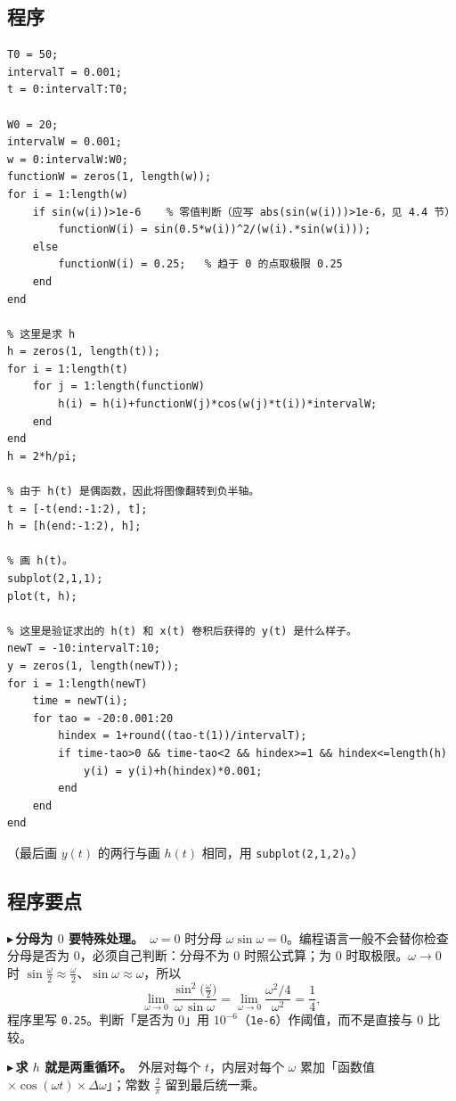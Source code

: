 \documentclass[UTF8,a4paper,11pt]{ctexart}
\newcounter{ex}[section]
\newcommand{\point}[1]{\par\addvspace{1ex}\noindent\textcolor{ptteal}{$\blacktriangleright$\,\textbf{#1}}\ }
\begin{document}
\subsection{程序}
\begin{codebox}
\small
\begin{verbatim}
T0 = 50;
intervalT = 0.001;
t = 0:intervalT:T0;

W0 = 20;
intervalW = 0.001;
w = 0:intervalW:W0;
functionW = zeros(1, length(w));
for i = 1:length(w)
    if sin(w(i))>1e-6    % 零值判断（应写 abs(sin(w(i)))>1e-6，见 4.4 节）
        functionW(i) = sin(0.5*w(i))^2/(w(i).*sin(w(i)));
    else
        functionW(i) = 0.25;   % 趋于 0 的点取极限 0.25
    end
end

% 这里是求 h
h = zeros(1, length(t));
for i = 1:length(t)
    for j = 1:length(functionW)
        h(i) = h(i)+functionW(j)*cos(w(j)*t(i))*intervalW;
    end
end
h = 2*h/pi;

% 由于 h(t) 是偶函数，因此将图像翻转到负半轴。
t = [-t(end:-1:2), t];
h = [h(end:-1:2), h];

% 画 h(t)。
subplot(2,1,1);
plot(t, h);

% 这里是验证求出的 h(t) 和 x(t) 卷积后获得的 y(t) 是什么样子。
newT = -10:intervalT:10;
y = zeros(1, length(newT));
for i = 1:length(newT)
    time = newT(i);
    for tao = -20:0.001:20
        hindex = 1+round((tao-t(1))/intervalT);
        if time-tao>0 && time-tao<2 && hindex>=1 && hindex<=length(h)
            y(i) = y(i)+h(hindex)*0.001;
        end
    end
end
\end{verbatim}
\end{codebox}
（最后画 $y(t)$ 的两行与画 $h(t)$ 相同，用 \texttt{subplot(2,1,2)}。）

\subsection{程序要点}
\point{分母为 $0$ 要特殊处理。}$\omega=0$ 时分母 $\omega\sin\omega=0$。编程语言一般不会替你检查分母是否为 $0$，必须自己判断：分母不为 $0$ 时照公式算；为 $0$ 时取极限。$\omega\to0$ 时 $\sin\frac\omega2\approx\frac\omega2$、$\sin\omega\approx\omega$，所以
\[
\lim_{\omega\to0}\frac{\sin^2\!\big(\frac{\omega}{2}\big)}{\omega\,\sin\omega}=\lim_{\omega\to0}\frac{\omega^2/4}{\omega^2}=\frac14 ,
\]
程序里写 \texttt{0.25}。判断「是否为 $0$」用 $10^{-6}$（\texttt{1e-6}）作阈值，而不是直接与 $0$ 比较。

\point{求 $h$ 就是两重循环。}外层对每个 $t$，内层对每个 $\omega$ 累加「函数值 $\times\cos(\omega t)\times\Delta\omega$」；常数 $\frac2\pi$ 留到最后统一乘。
\end{document}
